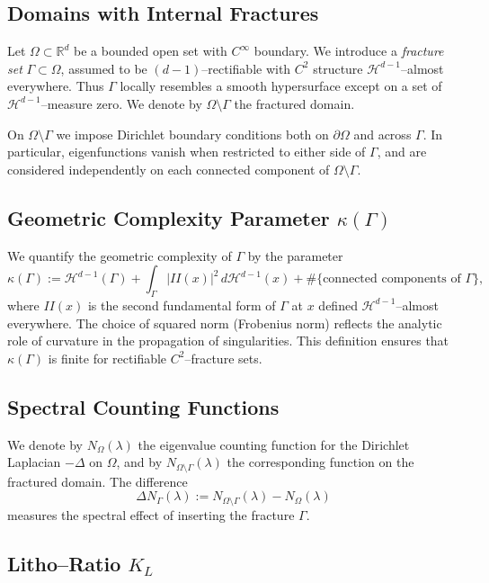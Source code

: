 \subsection{Domains with Internal Fractures}

Let $\Omega\subset\mathbb R^d$ be a bounded open set with $C^\infty$ boundary. 
We introduce a \emph{fracture set} $\Gamma\subset \Omega$, assumed to be 
$(d\!-\!1)$–rectifiable with $C^2$ structure $\mathcal H^{d-1}$–almost 
everywhere. Thus $\Gamma$ locally resembles a smooth hypersurface except on a 
set of $\mathcal H^{d-1}$–measure zero. We denote by $\Omega\setminus\Gamma$ 
the fractured domain.

On $\Omega\setminus\Gamma$ we impose Dirichlet boundary conditions both on 
$\partial\Omega$ and across $\Gamma$. In particular, eigenfunctions vanish 
when restricted to either side of $\Gamma$, and are considered independently 
on each connected component of $\Omega\setminus\Gamma$.

\subsection{Geometric Complexity Parameter \texorpdfstring{$\kappa(\Gamma)$}{κ(Γ)}}

We quantify the geometric complexity of $\Gamma$ by the parameter
\[
  \kappa(\Gamma) 
  := \mathcal H^{d-1}(\Gamma) 
   + \int_\Gamma |II(x)|^2\, d\mathcal H^{d-1}(x)
   + \#\{\text{connected components of }\Gamma\},
\]
where $II(x)$ is the second fundamental form of $\Gamma$ at $x$ defined 
$\mathcal H^{d-1}$–almost everywhere. The choice of squared norm (Frobenius 
norm) reflects the analytic role of curvature in the propagation of 
singularities. This definition ensures that $\kappa(\Gamma)$ is finite for 
rectifiable $C^2$–fracture sets.

\subsection{Spectral Counting Functions}

We denote by $N_{\Omega}(\lambda)$ the eigenvalue counting function for the 
Dirichlet Laplacian $-\Delta$ on $\Omega$, and by $N_{\Omega\setminus\Gamma}(\lambda)$ 
the corresponding function on the fractured domain. The difference
\[
  \Delta N_\Gamma(\lambda) 
  := N_{\Omega\setminus\Gamma}(\lambda) - N_{\Omega}(\lambda)
\]
measures the spectral effect of inserting the fracture $\Gamma$.

\subsection{Litho–Ratio \texorpdfstring{$K_L$}{K\_L}}

